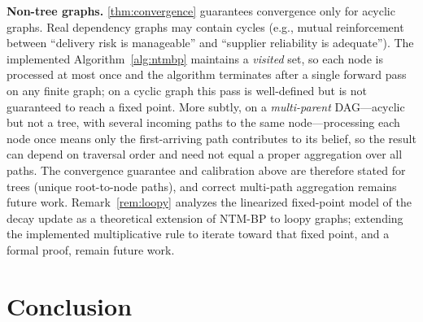 \documentclass{article}
\theoremstyle{definition}
\begin{document}
\textbf{Non-tree graphs.}  \cref{thm:convergence} guarantees
convergence only for acyclic graphs.  Real dependency graphs may
contain cycles (e.g., mutual reinforcement between ``delivery risk
is manageable'' and ``supplier reliability is adequate'').  The
implemented Algorithm~\ref{alg:ntmbp} maintains a \emph{visited} set,
so each node is processed at most once and the algorithm terminates
after a single forward pass on any finite graph; on a cyclic graph this
pass is well-defined but is not guaranteed to reach a fixed point.
More subtly, on a \emph{multi-parent} DAG---acyclic but not a tree, with
several incoming paths to the same node---processing each node once means
only the first-arriving path contributes to its belief, so the result can
depend on traversal order and need not equal a proper aggregation over all
paths.  The convergence guarantee and calibration above are therefore stated
for trees (unique root-to-node paths), and correct multi-path aggregation
remains future work.
Remark~\ref{rem:loopy} analyzes the linearized fixed-point model of the decay
update as a theoretical extension of NTM-BP to loopy graphs; extending
the implemented multiplicative rule to iterate toward that fixed point,
and a formal proof, remain future work.


\section{Conclusion}
\end{document}

